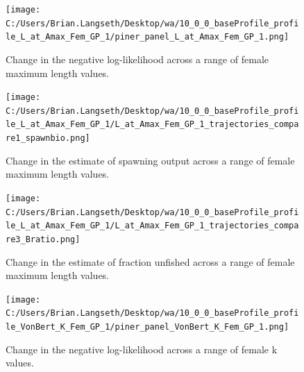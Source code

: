 \documentclass[11pt,
  english,
  a4paper,
]{article}
\begin{document}
\begin{figure}
\centering
\texttt{[image: C:/Users/Brian.Langseth/Desktop/wa/10\_0\_0\_baseProfile\_profile\_L\_at\_Amax\_Fem\_GP\_1/piner\_panel\_L\_at\_Amax\_Fem\_GP\_1.png]}
\caption{Change in the negative log-likelihood across a range of female maximum length values.\label{fig:linf-profile}}
\end{figure}

\tagmcend\tagstructend


\begin{figure}
\centering
\texttt{[image: C:/Users/Brian.Langseth/Desktop/wa/10\_0\_0\_baseProfile\_profile\_L\_at\_Amax\_Fem\_GP\_1/L\_at\_Amax\_Fem\_GP\_1\_trajectories\_compare1\_spawnbio.png]}
\caption{Change in the estimate of spawning output across a range of female maximum length values.\label{fig:linf-ssb}}
\end{figure}

\tagmcend\tagstructend


\begin{figure}
\centering
\texttt{[image: C:/Users/Brian.Langseth/Desktop/wa/10\_0\_0\_baseProfile\_profile\_L\_at\_Amax\_Fem\_GP\_1/L\_at\_Amax\_Fem\_GP\_1\_trajectories\_compare3\_Bratio.png]}
\caption{Change in the estimate of fraction unfished across a range of female maximum length values.\label{fig:linf-depl}}
\end{figure}

\tagmcend\tagstructend


\begin{figure}
\centering
\texttt{[image: C:/Users/Brian.Langseth/Desktop/wa/10\_0\_0\_baseProfile\_profile\_VonBert\_K\_Fem\_GP\_1/piner\_panel\_VonBert\_K\_Fem\_GP\_1.png]}
\caption{Change in the negative log-likelihood across a range of female k values.\label{fig:k-profile}}
\end{figure}

\tagmcend\tagstructend

\end{document}
